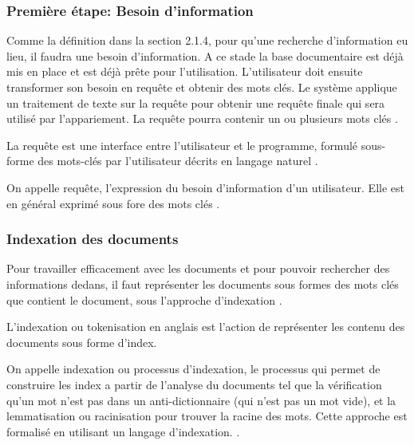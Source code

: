 \subsubsection{Première étape: Besoin d'information}
Comme la définition dans la section 2.1.4, pour qu'une recherche d'information eu lieu, il faudra une besoin d'information. A ce stade la base documentaire est déjà mis en place et est déjà prête pour l'utilisation. L'utilisateur doit ensuite transformer son besoin en requête et obtenir des mots clés. Le système applique un traitement de texte sur la requête pour obtenir une requête finale qui sera utilisé par l'appariement. La requête pourra contenir un ou plusieurs mots clés \citep{modern-ir}.

\begin{definition}
    La requête est une interface entre l'utilisateur et le programme, formulé sous-forme des mots-clés par l'utilisateur décrits en langage naturel \citep{amelioration-ri-approche-semantique}.
\end{definition}

\begin{definition}
    On appelle requête, l'expression du besoin d'information d'un utilisateur. Elle est en général exprimé sous fore des mots clés \citep{salton1989automatique}.
\end{definition}

\subsubsection{Indexation des documents}
Pour travailler efficacement avec les documents et pour pouvoir rechercher des informations dedans, il faut représenter les documents sous formes des mots clés que contient le document, sous l'approche d'indexation \citep{ir-on-web}.

\begin{definition}
    L'indexation ou tokenisation en anglais est l'action de représenter les contenu des documents sous forme d'index.
\end{definition}

\begin{definition}
    On appelle indexation ou processus d'indexation, le processus qui permet de construire les index a partir de l'analyse du documents tel que la vérification qu'un mot n'est pas dans un anti-dictionnaire (qui n'est pas un mot vide), et la lemmatisation ou racinisation pour trouver la racine des mots. Cette approche est formalisé en utilisant un langage d'indexation. \citep{paradis:tel-00005009}.
\end{definition}

